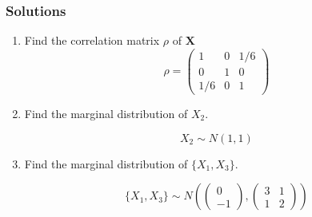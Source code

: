 \documentclass{beamer}
\begin{document}
\begin{frame}
\frametitle{Solutions}
\begin{enumerate}
\item Find the correlation matrix $\rho$ of $\mathbf{X}$
$$\rho = \begin{pmatrix}
1 & 0 & 1/6\\
0 & 1 & 0\\
1/6 & 0 & 1
\end{pmatrix}$$

\item Find the marginal distribution of $X_2$.

$$ X_2 \sim N(1, 1)$$
\item Find the marginal distribution of $\{X_1, X_3\}$.

$$\{X_1, X_3\} \sim N\left(\begin{pmatrix} 0 \\ -1 \end{pmatrix} , \begin{pmatrix} 3 & 1 \\ 1 & 2 \end{pmatrix}\right)$$
\end{enumerate}
\end{frame}
\end{document}
